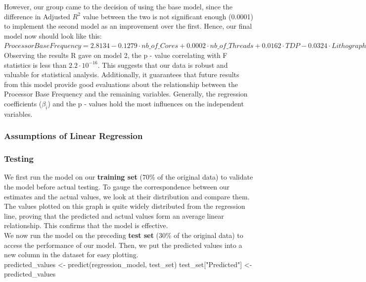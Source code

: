 However, our group came to the decision of using the base model, since the difference in Adjusted $R^2$ value between the two is not significant enough (0.0001) to implement the second model as an improvement over the first. Hence, our final model now should look like this:\\

$Processor Base Frequency = 2.8134 - 0.1279 \cdot nb\_of\_Cores + 0.0002 \cdot nb\_of\_Threads + 0.0162 \cdot TDP - 0.0324 \cdot Lithography$ \\

Observing the results R gave on model 2, the p - value correlating with F statistics is less than $2.2 \cdot 10^{-16}$. This suggests that our data is robust and valuable for statistical analysis. Additionally, it guarantees that future results from this model provide good evaluations about the relationship between the Processor Base Frequency and the remaining variables. Generally, the regression coefficients ($\beta_i$) and the p - values hold the most influences on the independent variables. 

\subsubsection{Assumptions of Linear Regression}


\subsubsection{Testing}
We first run the model on our \textbf{training set} (70\% of the original data) to validate the model before actual testing. To gauge the correspondence between our estimates and the actual values, we look at their distribution and compare them.\\


The values plotted on this graph is quite widely distributed from the regression line, proving that the predicted and actual values form an average linear relationship. This confirms that the model is effective.\\

We now run the model on the preceding \textbf{test set} (30\% of the original data) to access the performance of our model. Then, we put the predicted values into a new column in the dataset for easy plotting.\\

predicted\_values <- predict(regression\_model, test\_set)
test\_set["Predicted"] <- predicted\_values

